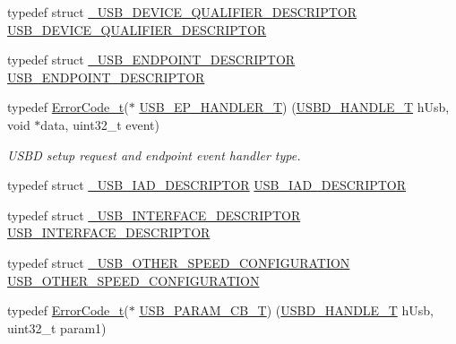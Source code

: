 \begin{DoxyCompactItemize}
\item 
typedef struct \hyperlink{struct__USB__DEVICE__QUALIFIER__DESCRIPTOR}{\+\_\+\+U\+S\+B\+\_\+\+D\+E\+V\+I\+C\+E\+\_\+\+Q\+U\+A\+L\+I\+F\+I\+E\+R\+\_\+\+D\+E\+S\+C\+R\+I\+P\+T\+OR} \hyperlink{group__USBD__Core_ga4460a327f0c59c1d44e550efcff1eb00}{U\+S\+B\+\_\+\+D\+E\+V\+I\+C\+E\+\_\+\+Q\+U\+A\+L\+I\+F\+I\+E\+R\+\_\+\+D\+E\+S\+C\+R\+I\+P\+T\+OR}
\item 
typedef struct \hyperlink{struct__USB__ENDPOINT__DESCRIPTOR}{\+\_\+\+U\+S\+B\+\_\+\+E\+N\+D\+P\+O\+I\+N\+T\+\_\+\+D\+E\+S\+C\+R\+I\+P\+T\+OR} \hyperlink{group__USBD__Core_ga652b2871268bd903653cbff0f3448a6e}{U\+S\+B\+\_\+\+E\+N\+D\+P\+O\+I\+N\+T\+\_\+\+D\+E\+S\+C\+R\+I\+P\+T\+OR}
\item 
typedef \hyperlink{error_8h_a905255056c349318139d94aa4523d516}{Error\+Code\+\_\+t}($\ast$ \hyperlink{group__USBD__Core_gaa578d29a85226108ef62c6d5c325b742}{U\+S\+B\+\_\+\+E\+P\+\_\+\+H\+A\+N\+D\+L\+E\+R\+\_\+T}) (\hyperlink{group__USBD__Core_gafdbb2204d929cb9d75736bd2b42342ac}{U\+S\+B\+D\+\_\+\+H\+A\+N\+D\+L\+E\+\_\+T} h\+Usb, void $\ast$data, uint32\+\_\+t event)
\begin{DoxyCompactList}\small\item\em U\+S\+BD setup request and endpoint event handler type. \end{DoxyCompactList}\item 
typedef struct \hyperlink{struct__USB__IAD__DESCRIPTOR}{\+\_\+\+U\+S\+B\+\_\+\+I\+A\+D\+\_\+\+D\+E\+S\+C\+R\+I\+P\+T\+OR} \hyperlink{group__USBD__Core_ga6b053e842151d5c5dcdace597e45a36b}{U\+S\+B\+\_\+\+I\+A\+D\+\_\+\+D\+E\+S\+C\+R\+I\+P\+T\+OR}
\item 
typedef struct \hyperlink{struct__USB__INTERFACE__DESCRIPTOR}{\+\_\+\+U\+S\+B\+\_\+\+I\+N\+T\+E\+R\+F\+A\+C\+E\+\_\+\+D\+E\+S\+C\+R\+I\+P\+T\+OR} \hyperlink{group__USBD__Core_gac933513ce6cbf852d0dc998bd8fb333d}{U\+S\+B\+\_\+\+I\+N\+T\+E\+R\+F\+A\+C\+E\+\_\+\+D\+E\+S\+C\+R\+I\+P\+T\+OR}
\item 
typedef struct \hyperlink{struct__USB__OTHER__SPEED__CONFIGURATION}{\+\_\+\+U\+S\+B\+\_\+\+O\+T\+H\+E\+R\+\_\+\+S\+P\+E\+E\+D\+\_\+\+C\+O\+N\+F\+I\+G\+U\+R\+A\+T\+I\+ON} \hyperlink{group__USBD__Core_ga808d47bcf11e648d95efc88e330fabc5}{U\+S\+B\+\_\+\+O\+T\+H\+E\+R\+\_\+\+S\+P\+E\+E\+D\+\_\+\+C\+O\+N\+F\+I\+G\+U\+R\+A\+T\+I\+ON}
\item 
typedef \hyperlink{error_8h_a905255056c349318139d94aa4523d516}{Error\+Code\+\_\+t}($\ast$ \hyperlink{group__USBD__Core_ga7df622c61ebb152b83dd5972ac789b28}{U\+S\+B\+\_\+\+P\+A\+R\+A\+M\+\_\+\+C\+B\+\_\+T}) (\hyperlink{group__USBD__Core_gafdbb2204d929cb9d75736bd2b42342ac}{U\+S\+B\+D\+\_\+\+H\+A\+N\+D\+L\+E\+\_\+T} h\+Usb, uint32\+\_\+t param1)

\end{DoxyCompactItemize}
